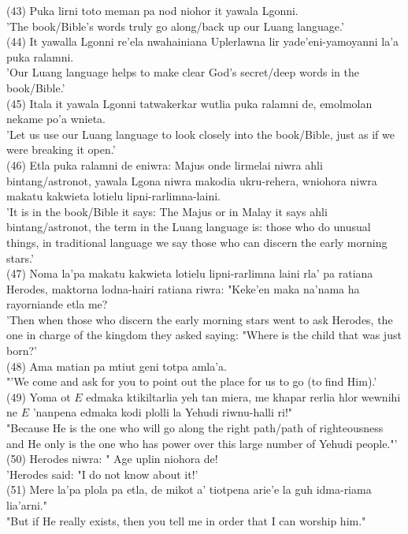 \documentclass[10pt]{article}
\begin{document}
(43) Puka lirni toto meman pa nod niohor it yawala Lgonni.\\
'The book/Bible's words truly go along/back up our Luang language.'\\
(44) It yawalla Lgonni re'ela nwahainiana Uplerlawna lir yade'eni-yamoyanni la'a puka ralamni.\\
'Our Luang language helps to make clear God's secret/deep words in the book/Bible.'\\
(45) Itala it yawala Lgonni tatwakerkar wutlia puka ralamni de, emolmolan nekame po'a wnieta.\\
'Let us use our Luang language to look closely into the book/Bible, just as if we were breaking it open.'\\
(46) Etla puka ralamni de eniwra: Majus onde lirmelai niwra ahli bintang/astronot, yawala Lgona niwra makodia ukru-rehera, wniohora niwra makatu kakwieta lotielu lipni-rarlimna-laini.\\
'It is in the book/Bible it says: The Majus or in Malay it says ahli bintang/astronot, the term in the Luang language is: those who do unusual things, in traditional language we say those who can discern the early morning stars.'\\
(47) Noma la'pa makatu kakwieta lotielu lipni-rarlimna laini rla' pa ratiana Herodes, maktorna lodna-hairi ratiana riwra: "Keke'en maka na'nama ha rayorniande etla me?\\
'Then when those who discern the early morning stars went to ask Herodes, the one in charge of the kingdom they asked saying: "Where is the child that was just born?'\\
(48) Ama matian pa mtiut geni totpa amla'a.\\
"'We come and ask for you to point out the place for us to go (to find Him).'\\
(49) Yoma ot \(E\) edmaka ktikiltarlia yeh tan miera, me khapar rerlia hlor wewnihi ne \(E\) 'nanpena edmaka kodi plolli la Yehudi riwnu-halli ri!"\\
"Because He is the one who will go along the right path/path of righteousness and He only is the one who has power over this large number of Yehudi people."'\\
(50) Herodes niwra: " Age uplin niohora de!\\
'Herodes said: "I do not know about it!'\\
(51) Mere la'pa plola pa etla, de mikot a' tiotpena arie'e la guh idma-riama lia'arni."\\
"But if He really exists, then you tell me in order that I can worship him."\\
\end{document}
